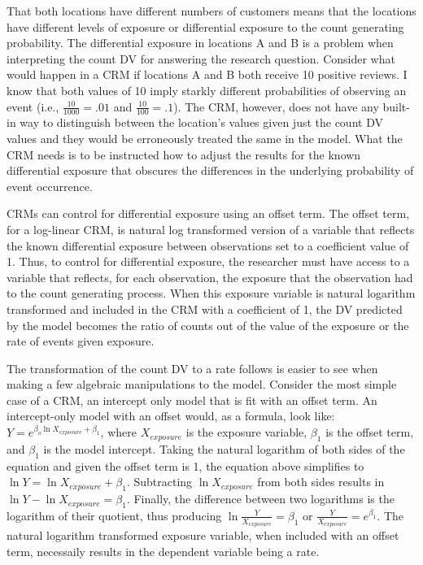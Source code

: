 \documentclass[ShortAfour,times,sageapa]{sagej}
\begin{document}
	That both locations have different numbers of customers means that the locations have different levels of exposure or differential exposure to the count generating probability. 
	The differential exposure in locations A and B is a problem when interpreting the count DV for answering the research question. 
	Consider what would happen in a CRM if locations A and B both receive 10 positive reviews.
	I know that both values of 10 imply starkly different probabilities of observing an event (i.e., $\frac{10}{1000} = .01$ and $\frac{10}{100} = .1$).
	The CRM, however, does not have any built-in way to distinguish between the location's values given just the count DV values and they would be erroneously treated the same in the model.
	What the CRM needs is to be instructed how to adjust the results for the known differential exposure that obscures the differences in the underlying probability of event occurrence.
	
	CRMs can control for differential exposure using an offset term.  
	The offset term, for a log-linear CRM, is natural log transformed version of a variable that reflects the known differential exposure between observations set to a coefficient value of 1.
	Thus, to control for differential exposure, the researcher must have access to a variable that reflects, for each observation, the exposure that the observation had to the count generating process.
	When this exposure variable is natural logarithm transformed and included in the CRM with a coefficient of 1, the DV predicted by the model becomes the ratio of counts out of the value of the exposure or the rate of events given exposure.
	
	The transformation of the count DV to a rate follows is easier to see when making a few algebraic manipulations to the model.
	Consider the most simple case of a CRM, an intercept only model that is fit with an offset term.
	An intercept-only model with an offset would, as a formula, look like: $Y = e^{\beta_o\ln X_{exposure} + \beta_1}$, where $X_{exposure}$ is the exposure variable, $\beta_1$ is the offset term, and $\beta_1$ is the model intercept.
	Taking the natural logarithm of both sides of the equation and given the offset term is 1, the equation above simplifies to $\ln Y = \ln X_{exposure} + \beta_1$.
	Subtracting $\ln X_{exposure}$ from both sides results in $\ln Y - \ln X_{exposure} = \beta_1$.
	Finally, the difference between two logarithms is the logarithm of their quotient, thus producing $\ln \frac{Y}{X_{exposure}} = \beta_1$ or $\frac{Y}{X_{exposure}} = e^{\beta_1}$.
	The natural logarithm transformed exposure variable, when included with an offset term, necessaily results in the dependent variable being a rate.
	
\end{document}
